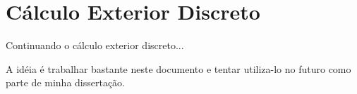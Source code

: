 \section{Cálculo Exterior Discreto}

Continuando o cálculo exterior discreto...

A idéia é trabalhar bastante neste documento e tentar utiliza-lo no futuro como parte de minha dissertação.
